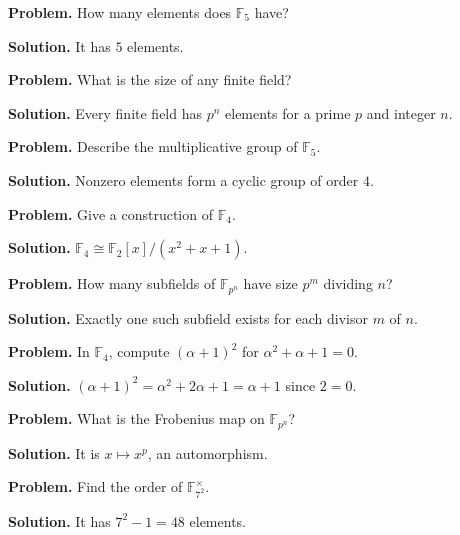 \begin{example}\label{ex:sec7-1}
\textbf{Problem.} How many elements does $\mathbb{F}_5$ have?

\textbf{Solution.} It has $5$ elements.
\end{example}

\begin{example}\label{ex:sec7-2}
\textbf{Problem.} What is the size of any finite field?

\textbf{Solution.} Every finite field has $p^n$ elements for a prime $p$ and integer $n$.
\end{example}

\begin{example}\label{ex:sec7-3}
\textbf{Problem.} Describe the multiplicative group of $\mathbb{F}_5$.

\textbf{Solution.} Nonzero elements form a cyclic group of order $4$.
\end{example}

\begin{example}\label{ex:sec7-4}
\textbf{Problem.} Give a construction of $\mathbb{F}_4$.

\textbf{Solution.} $\mathbb{F}_4 \cong \mathbb{F}_2[x]/(x^2+x+1)$.
\end{example}

\begin{example}\label{ex:sec7-5}
\textbf{Problem.} How many subfields of $\mathbb{F}_{p^n}$ have size $p^m$ dividing $n$?

\textbf{Solution.} Exactly one such subfield exists for each divisor $m$ of $n$.
\end{example}

\begin{example}\label{ex:sec7-6}
\textbf{Problem.} In $\mathbb{F}_4$, compute $(\alpha+1)^2$ for $\alpha^2+\alpha+1=0$.

\textbf{Solution.} $(\alpha+1)^2=\alpha^2+2\alpha+1=\alpha+1$ since $2=0$.
\end{example}

\begin{example}\label{ex:sec7-7}
\textbf{Problem.} What is the Frobenius map on $\mathbb{F}_{p^n}$?

\textbf{Solution.} It is $x\mapsto x^p$, an automorphism.
\end{example}

\begin{example}\label{ex:sec7-8}
\textbf{Problem.} Find the order of $\mathbb{F}_{7^2}^\times$.

\textbf{Solution.} It has $7^2-1=48$ elements.
\end{example}

